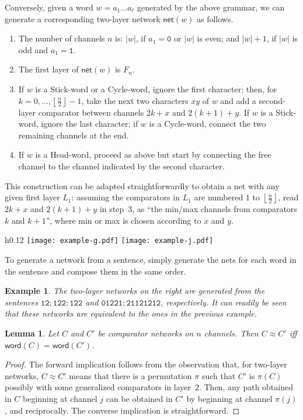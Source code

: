 \documentclass[10pt]{IEEEtran}
\newcommand{\net}{\mathsf{net}}
\newcommand{\word}{\mathsf{word}}
\newcommand{\sent}[1]{\ensuremath{\mathtt{#1}}} \newcommand{\GG}{{\cal G}}
\newtheorem{lemma}{Lemma}
\newtheorem{example}{Example}
\begin{document}
Conversely, given a word $w=a_1\ldots a_\ell$ generated by the above grammar, we can
generate a corresponding two-layer network $\net(w)$ as follows.
\begin{enumerate}
\item The number of channels $n$ is:
$|w|$, if $a_1=\sent{0}$ or $|w|$ is even;
and $|w|+1$, if $|w|$ is odd and $a_1=\sent{1}$.
\item The first layer of $\net(w)$ is $F_n$.
\item If $w$ is a Stick-word or a Cycle-word, ignore the first character; then,
  for $k=0,\ldots,\left\lfloor\frac n2\right\rfloor-1$, take the next two
  characters $xy$ of $w$ and add a second-layer comparator between channels
  $2k+x$ and $2(k+1)+y$.  If $w$ is a Stick-word, ignore the last character;
  if $w$ is a Cycle-word, connect the two remaining channels at the end.
\item If $w$ is a Head-word, proceed as above but start by connecting the free
  channel to the channel indicated by the second character.
\end{enumerate}
This construction can be adapted straightforwardly to obtain a net with any
given first layer $L_1$: assuming the comparators in $L_1$ are numbered $1$ to
$\left\lfloor\frac n2\right\rfloor$, read $2k+x$ and $2(k+1)+y$ in step~$3$,
as ``the min/max channels from comparators $k$ and $k+1$'', where min or max
is chosen according to $x$ and $y$.

\begin{wrapfigure}[10]{h}{0.12\textwidth}
  \texttt{[image: example-g.pdf]}
  \quad\texttt{[image: example-j.pdf]}
\end{wrapfigure}

To generate a network from a sentence, simply generate the nets for each word in the sentence and compose them in the same order.

\begin{example}
  The two-layer networks on the right are generated from the sentences $\sent{12;122;122}$ and $\sent{01221;21121212}$, respectively.
It can readily be seen that these networks are equivalent to the ones
  in the previous example.
\end{example}

\begin{lemma}
  Let $C$ and $C'$ be comparator networks on $n$ channels.  Then $C \approx C'$ iff $\word(C)=\word(C')$.
\end{lemma}
\begin{proof}
  The forward implication follows from the observation that, for
  two-layer networks, $C \approx C'$ means that there is a permutation
  $\pi$ such that $C'$ is $\pi(C)$ possibly with some generalized comparators
  in layer~$2$. Then, any path obtained in $C$ beginning at
  channel $j$ can be obtained in $C'$ by beginning at channel
  $\pi(j)$, and reciprocally.  The converse implication is
  straightforward.
\end{proof}
\end{document}
